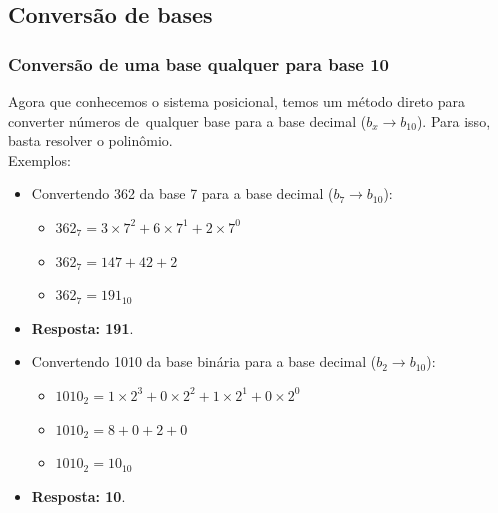 \documentclass[12pt]{article}
\begin{document}
\subsection{Conversão de bases}
\vspace{0.2cm}
\subsubsection{Conversão de uma base qualquer para base 10}
Agora que conhecemos o sistema posicional, temos um método direto para converter números de qualquer base para a base decimal ($b_{x} \rightarrow{} b_{10}$). Para isso, basta resolver o polinômio.
\vspace{0.2cm} \\
Exemplos:
\begin{itemize}
\item Convertendo 362 da base 7 para a base decimal ($b_{7} \rightarrow{} b_{10}$):
    \begin{itemize}
        \item [""] $362_{7} = 3 \times 7^{2} + 6 \times 7^{1} + 2 \times 7^{0}$
        \item [""] $362_{7} = 147 + 42 + 2$
        \item [""] $362_{7} = 191_{10}$
    \end{itemize}
\item [""] \textbf{Resposta: 191}.
\item Convertendo 1010 da base binária para a base decimal ($b_{2} \rightarrow{} b_{10}$):
    \begin{itemize}
        \item [""] $1010_{2} = 1 \times 2^{3} + 0 \times 2^{2} + 1 \times 2^{1} + 0 \times 2^{0}$
        \item [""] $1010_{2} = 8 + 0 + 2 + 0$
        \item [""] $1010_{2} = 10_{10}$
    \end{itemize}
\item [""] \textbf{Resposta: 10}.
\end{itemize}
\end{document}
